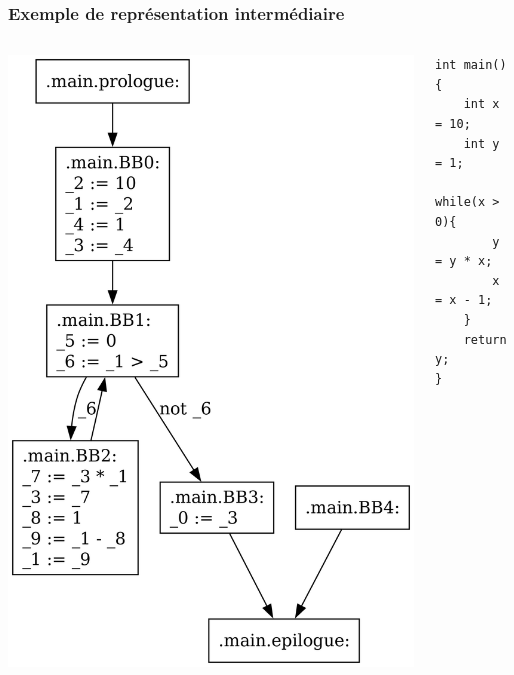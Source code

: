 \documentclass{beamer}
\begin{document}
\begin{frame}[fragile]
    \frametitle{Exemple de représentation intermédiaire}

    \begin{columns}
        \begin{column}{.5\textwidth}
            \begin{center}
                \includegraphics[width=\textwidth,height=0.8\textheight,keepaspectratio]{graphs/fact_no_opti.dot.png}
            \end{center}
        \end{column}
        \begin{column}{.5\textwidth}
            \begin{lstlisting}
int main(){
    int x = 10;
    int y = 1;
    while(x > 0){
        y = y * x;
        x = x - 1;
    }
    return y;
}
            \end{lstlisting}
        \end{column}
    \end{columns}

\end{frame}
\end{document}
